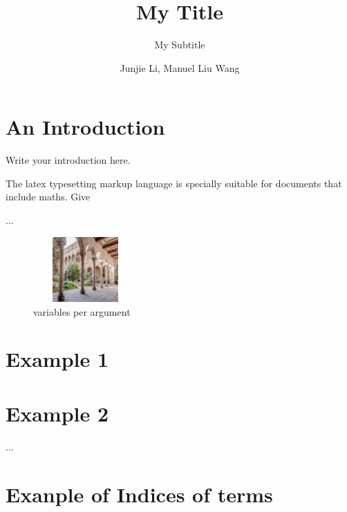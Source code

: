\documentclass[a4paper,12pt,times,numbered,print,index, oneside]{template/UBtemplate}
\title{My Title}
\subtitle{My Subtitle}
\author{Junjie Li, Manuel Liu Wang}
\begin{document}






















\section{An Introduction}


Write your introduction here.


 
 
 The \Gls{latex} typesetting markup language is specially suitable 
for documents that include \gls{maths}. Give
 

...

\begin{figure}[H]
    \centering
    \includegraphics[width=4cm, height=2.5cm]{images/edifici-historic-universitat-de-barcelona.jpg}
    \caption{variables per argument}
    \label{taula}
\end{figure}%

\section{Example 1}


\section{Example 2}

...

\section{Exanple of Indices of terms}
\end{document}
